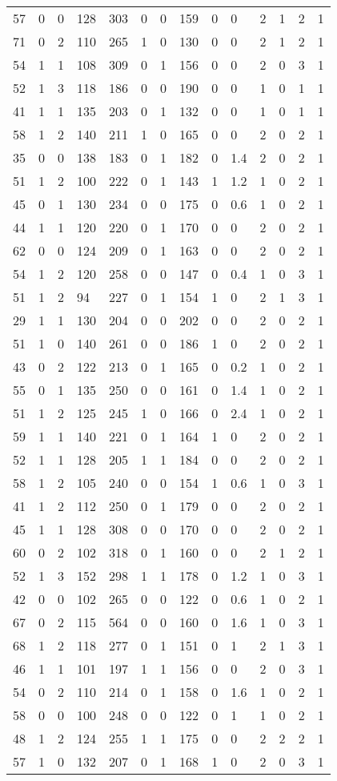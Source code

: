 \documentclass{article}
\begin{document}
\begin{longtable}{|l|l|l|l|l|l|l|l|l|l|l|l|l|l|}
57&0&0&128&303&0&0&159&0&0&2&1&2&1 \\ 
71&0&2&110&265&1&0&130&0&0&2&1&2&1 \\ 
54&1&1&108&309&0&1&156&0&0&2&0&3&1 \\ 
52&1&3&118&186&0&0&190&0&0&1&0&1&1 \\ 
41&1&1&135&203&0&1&132&0&0&1&0&1&1 \\ 
58&1&2&140&211&1&0&165&0&0&2&0&2&1 \\ 
35&0&0&138&183&0&1&182&0&1.4&2&0&2&1 \\ 
51&1&2&100&222&0&1&143&1&1.2&1&0&2&1 \\ 
45&0&1&130&234&0&0&175&0&0.6&1&0&2&1 \\ 
44&1&1&120&220&0&1&170&0&0&2&0&2&1 \\ 
62&0&0&124&209&0&1&163&0&0&2&0&2&1 \\ 
54&1&2&120&258&0&0&147&0&0.4&1&0&3&1 \\ 
51&1&2&94&227&0&1&154&1&0&2&1&3&1 \\ 
29&1&1&130&204&0&0&202&0&0&2&0&2&1 \\ 
51&1&0&140&261&0&0&186&1&0&2&0&2&1 \\ 
43&0&2&122&213&0&1&165&0&0.2&1&0&2&1 \\ 
55&0&1&135&250&0&0&161&0&1.4&1&0&2&1 \\ 
51&1&2&125&245&1&0&166&0&2.4&1&0&2&1 \\ 
59&1&1&140&221&0&1&164&1&0&2&0&2&1 \\ 
52&1&1&128&205&1&1&184&0&0&2&0&2&1 \\ 
58&1&2&105&240&0&0&154&1&0.6&1&0&3&1 \\ 
41&1&2&112&250&0&1&179&0&0&2&0&2&1 \\ 
45&1&1&128&308&0&0&170&0&0&2&0&2&1 \\ 
60&0&2&102&318&0&1&160&0&0&2&1&2&1 \\ 
52&1&3&152&298&1&1&178&0&1.2&1&0&3&1 \\ 
42&0&0&102&265&0&0&122&0&0.6&1&0&2&1 \\ 
67&0&2&115&564&0&0&160&0&1.6&1&0&3&1 \\ 
68&1&2&118&277&0&1&151&0&1&2&1&3&1 \\ 
46&1&1&101&197&1&1&156&0&0&2&0&3&1 \\ 
54&0&2&110&214&0&1&158&0&1.6&1&0&2&1 \\ 
58&0&0&100&248&0&0&122&0&1&1&0&2&1 \\ 
48&1&2&124&255&1&1&175&0&0&2&2&2&1 \\ 
57&1&0&132&207&0&1&168&1&0&2&0&3&1 \\ 

\end{longtable}
\end{document}
